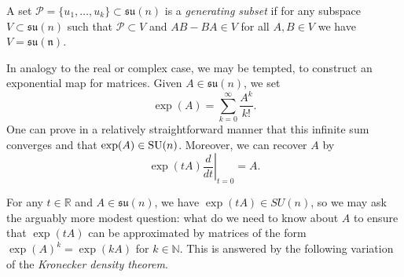 \documentclass[a4paper, oneside, 12pt]{amsart}
\newcommand*{\PauliGroup}{\ensuremath{\mathcal{P}}}
\begin{document}
\begin{definition}\label{def:generating-subset}
  A set \( \PauliGroup = \{ u_1, \dots, u_k \} \subset \mathfrak{su}(n) \) is a \emph{generating subset} if for any subspace \(V \subset \mathfrak{su}(n)\)  such that \(\PauliGroup \subset V\) and \(AB- BA \in V\) for all \(A,B\in V\) we have \(V = \mathfrak{su(n)}\).
\end{definition}

In analogy to the real or complex case, we may be tempted, to construct an exponential map for matrices.
Given \( A \in \mathfrak{su}(n) \), we set
\begin{equation}
  \exp(A) = \sum_{k=0}^\infty \frac{A^k}{k!}.
\end{equation}
One can prove in a relatively straightforward manner that this infinite sum converges and that \( \exp(A) \in \operatorname{SU}(n)\).
Moreover, we can recover \(A\) by
\begin{equation*}
  \left.\exp(tA) \frac{d}{dt}\right\vert_{t=0} = A.
\end{equation*}

For any \(t\in \mathbb{R}\) and \(A \in \mathfrak{su}(n)\), we have \(\exp(tA) \in SU(n)\), so we may ask the arguably more modest question: what do we need to know about \(A\) to ensure that \(\exp(tA)\) can be approximated by matrices of the form \(\exp(A)^{k} = \exp(kA)\) for \(k\in \mathbb{N}\).
This is answered by the following variation of the \emph{Kronecker density theorem}.
\end{document}

